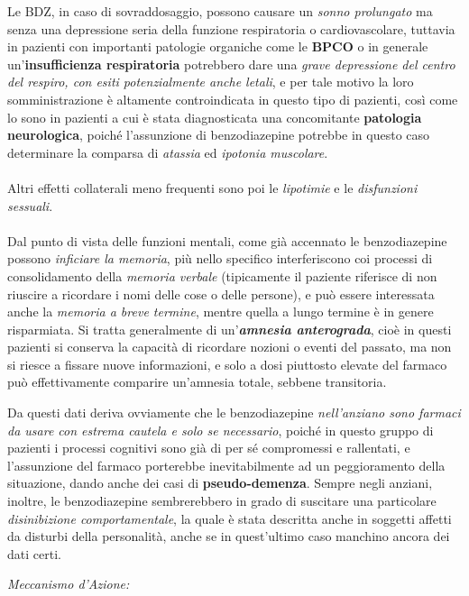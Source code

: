 \begin{itemize}
Le BDZ, in caso di sovraddosaggio, possono causare un \emph{sonno
prolungato} ma senza una depressione seria della funzione respiratoria o
cardiovascolare, tuttavia in pazienti con importanti patologie organiche
come le \textbf{BPCO} o in generale un'\textbf{insufficienza
respiratoria} potrebbero dare una \emph{grave depressione del centro del
respiro, con esiti potenzialmente anche letali}, e per tale motivo la
loro somministrazione è altamente controindicata in questo tipo di
pazienti, così come lo sono in pazienti a cui è stata diagnosticata una
concomitante \textbf{patologia neurologica}, poiché l'assunzione di
benzodiazepine potrebbe in questo caso determinare la comparsa di
\emph{atassia} ed \emph{ipotonia muscolare}.
\\\\
Altri effetti collaterali meno frequenti sono poi le \emph{lipotimie} e
le \emph{disfunzioni sessuali}.
\\\\
Dal punto di vista delle funzioni mentali, come già accennato le
benzodiazepine possono \emph{inficiare la memoria}, più nello specifico
interferiscono coi processi di consolidamento della \emph{memoria
verbale} (tipicamente il paziente riferisce di non riuscire a ricordare
i nomi delle cose o delle persone), e può essere interessata anche la
\emph{memoria a breve termine}, mentre quella a lungo termine è in
genere risparmiata. Si tratta generalmente di un'\textbf{\emph{amnesia
anterograda}}, cioè in questi pazienti si conserva la capacità di
ricordare nozioni o eventi del passato, ma non si riesce a fissare nuove
informazioni, e solo a dosi piuttosto elevate del farmaco può
effettivamente comparire un'amnesia totale, sebbene transitoria.

Da questi dati deriva ovviamente che le benzodiazepine
\emph{nell'anziano sono farmaci da usare con estrema cautela e solo se
necessario}, poiché in questo gruppo di pazienti i processi cognitivi
sono già di per sé compromessi e rallentati, e l'assunzione del farmaco
porterebbe inevitabilmente ad un peggioramento della situazione, dando
anche dei casi di \textbf{pseudo-demenza}. Sempre negli anziani,
inoltre, le benzodiazepine sembrerebbero in grado di suscitare una
particolare \emph{disinibizione comportamentale}, la quale è stata
descritta anche in soggetti affetti da disturbi della personalità, anche
se in quest'ultimo caso manchino ancora dei dati certi.

\emph{\emph{Meccanismo d'Azione:}}


\end{itemize}
